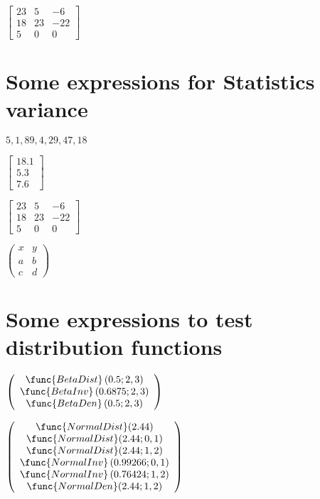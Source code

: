 \documentclass{article}
\begin{document}
$\left[ 
\begin{array}{rrr}
23 & 5 & -6 \\ 
18 & 23 & -22 \\ 
5 & 0 & 0%
\end{array}%
\right] $

\section{Some expressions for Statistics variance}

$5,1,89,4,29,47,18$

$\left[ 
\begin{array}{r}
18.1 \\ 
5.3 \\ 
7.6%
\end{array}%
\right] $

$\left[ 
\begin{array}{rrr}
23 & 5 & -6 \\ 
18 & 23 & -22 \\ 
5 & 0 & 0%
\end{array}%
\right] $

$\left( 
\begin{array}{cc}
x & y \\ 
a & b \\ 
c & d%
\end{array}%
\right) $

\section{Some expressions to test distribution functions}

$\left( 
\begin{array}{c}
\func{BetaDist}\left( 0.5;2,3\right)  \\ 
\func{BetaInv}\left( 0.6875;2,3\right)  \\ 
\func{BetaDen}\left( 0.5;2,3\right) 
\end{array}%
\right) $

$\left( 
\begin{array}{c}
\func{NormalDist}(2.44) \\ 
\func{NormalDist}(2.44;0,1) \\ 
\func{NormalDist}(2.44;1,2) \\ 
\func{NormalInv}\left( 0.99266;0,1\right)  \\ 
\func{NormalInv}\left( 0.76424;1,2\right)  \\ 
\func{NormalDen}(2.44;1,2)%
\end{array}%
\right) $
\end{document}
